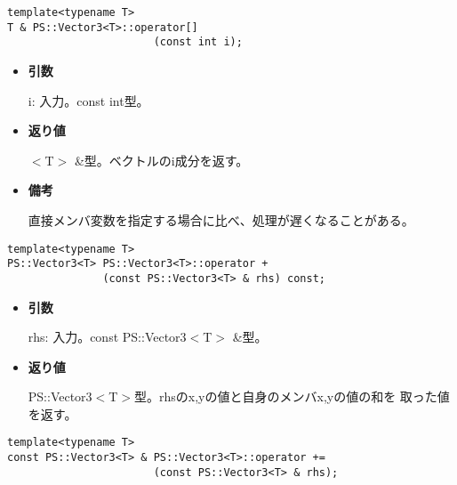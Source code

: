 \begin{screen}
\begin{verbatim}
template<typename T>
T & PS::Vector3<T>::operator[]
                       (const int i);
\end{verbatim}
\end{screen}

\begin{itemize}

\item{{\bf 引数}}

{i}: 入力。{const int}型。

\item{{\bf 返り値}}

{$<$T$>$ \&}型。ベクトルのi成分を返す。

\item{{\bf 備考}}

  直接メンバ変数を指定する場合に比べ、処理が遅くなることがある。

\end{itemize}


\mbox{}

\begin{screen}
\begin{verbatim}
template<typename T>
PS::Vector3<T> PS::Vector3<T>::operator + 
               (const PS::Vector3<T> & rhs) const;
\end{verbatim}
\end{screen}

\begin{itemize}

\item{{\bf 引数}}

{rhs}: 入力。{const PS::Vector3$<$T$>$ \&}型。

\item{{\bf 返り値}}

{PS::Vector3$<$T$>$}型。{rhs}のx,yの値と自身のメンバx,yの値の和を
取った値を返す。

\end{itemize}


\begin{screen}
\begin{verbatim}
template<typename T>
const PS::Vector3<T> & PS::Vector3<T>::operator += 
                       (const PS::Vector3<T> & rhs);
\end{verbatim}
\end{screen}

